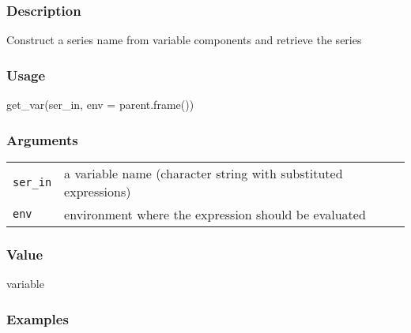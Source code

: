 \documentclass[
  letterpaper,
  DIV=11,
  numbers=noendperiod]{scrreport}
\newenvironment{Shaded}{\begin{snugshade}}{\end{snugshade}}
\newcommand{\AttributeTok}[1]{\textcolor[rgb]{0.40,0.45,0.13}{#1}}
\newcommand{\FunctionTok}[1]{\textcolor[rgb]{0.28,0.35,0.67}{#1}}
\newcommand{\NormalTok}[1]{\textcolor[rgb]{0.00,0.23,0.31}{#1}}
\newcommand{\OtherTok}[1]{\textcolor[rgb]{0.00,0.23,0.31}{#1}}
\newcommand{\SpecialCharTok}[1]{\textcolor[rgb]{0.37,0.37,0.37}{#1}}
\newcommand{\StringTok}[1]{\textcolor[rgb]{0.13,0.47,0.30}{#1}}
\begin{document}
\subsubsection{Description}\label{description-58}

Construct a series name from variable components and retrieve the series

\subsubsection{Usage}\label{usage-58}

\begin{Shaded}
\begin{Highlighting}[]
\FunctionTok{get\_var}\NormalTok{(ser\_in, }\AttributeTok{env =} \FunctionTok{parent.frame}\NormalTok{())}
\end{Highlighting}
\end{Shaded}

\subsubsection{Arguments}\label{arguments-58}

\begin{longtable}[]{@{}ll@{}}
\toprule\noalign{}
\endhead
\bottomrule\noalign{}
\endlastfoot
\texttt{ser\_in} & a variable name (character string with substituted
expressions) \\
\texttt{env} & environment where the expression should be evaluated \\
\end{longtable}

\subsubsection{Value}\label{value-58}

variable

\subsubsection{Examples}\label{examples-58}

\begin{Shaded}
\end{Shaded}
\end{document}
